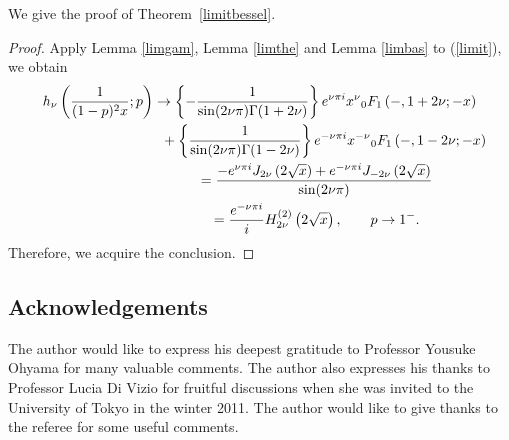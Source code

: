 \documentclass[pdftex]{sigma}
\begin{document}
We give the proof of Theorem~\ref{limitbessel}.

\begin{proof}Apply Lemma \ref{limgam}, Lemma \ref{limthe} and Lemma \ref{limbas} to (\ref{limit}), we obtain
\begin{gather*}
h_\nu \left(\frac{1}{(1-p)^2x};p\right)\to  \left\{-\frac{1}{\sin (2\nu\pi )\Gamma (1+2\nu )}\right\}e^{\nu\pi i}x^{\nu}{}_0F_1\left(-,1+2\nu ;-x\right)\\
\hphantom{h_\nu \left(\frac{1}{(1-p)^2x};p\right)\to}{}
+\left\{\frac{1}{\sin (2\nu\pi )\Gamma (1-2\nu )}\right\}e^{-\nu\pi i}x^{-\nu}{}_0F_1\left(-,1-2\nu ;-x\right)\\
\hphantom{h_\nu \left(\frac{1}{(1-p)^2x};p\right)}{}
=\frac{-e^{\nu\pi i}J_{2\nu}\left(2\sqrt{x}\right)+
e^{-\nu\pi i}J_{-2\nu}\left(2\sqrt{x}\right)}{\sin (2\nu\pi )}\\
\hphantom{h_\nu \left(\frac{1}{(1-p)^2x};p\right)}{}
=\frac{e^{-\nu\pi i}}{i}H_{2\nu}^{(2)}\left(2\sqrt{x}\right)
,\qquad p\to 1^-.
\end{gather*}
Therefore, we acquire the conclusion.
\end{proof}

\subsection*{Acknowledgements}
The author would like to express his deepest gratitude to Professor Yousuke Ohyama for many valuable comments. The author also expresses his thanks to Professor Lucia Di Vizio for fruitful discussions when she was invited to the University of Tokyo in the winter 2011. The author would like to give thanks to the referee for some useful comments.
\end{document}
